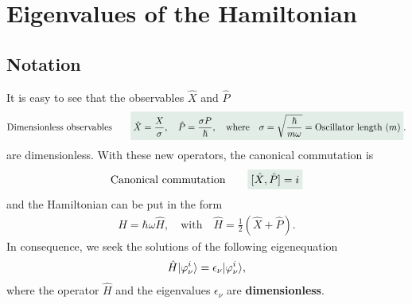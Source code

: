 \section{Eigenvalues of the Hamiltonian}
%
\subsection{Notation}
It is easy to see that the observables $\hat{X}$ and $\hat{P}$ 
\begin{align*}
    \text{Dimensionless observables}\qquad\highlight{\hat{X}=\frac{X}{\sigma},\quad\hat{P}=\frac{\sigma P}{\hbar},\quad\text{where}\quad\sigma=\sqrt{\frac{\hbar}{m\omega}}=\text{Oscillator length $(m)$}}.
\end{align*}
are dimensionless. With these new operators, the canonical commutation is 
\begin{align}
    \text{Canonical commutation}\qquad\highlight{[\hat{X},\hat{P}]=i}
\end{align}
and the Hamiltonian can be put in the form 
\begin{align}
    H=\hbar\omega\hat{H},\quad\text{with}\quad \hat{H}=\frac{1}{2}(\hat{X}+\hat{P}).
\end{align}
In consequence, we seek the solutions of the following eigenequation
\begin{align*}
    \hat{H}|\varphi_\nu^i\rangle=\epsilon_\nu|\varphi_\nu^i\rangle,
\end{align*}
where the operator $\hat{H}$ and the eigenvalues $\epsilon_\nu$ are \textbf{dimensionless}.

